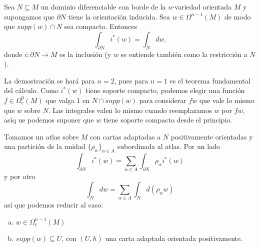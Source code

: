 \documentclass[CV.tex]{subfiles}
\begin{document}
\begin{teorema}[Stokes]
Sea $N\subseteq M$ un dominio diferenciable con borde de la $n$-variedad orientada $M$ y supongamos que $\partial N$ tiene la orientación inducida. Sea $w\in\Omega^{n-1}(M)$ de modo que $supp(w)\cap N$ sea compacto. Entonces
\[
\int_{\partial N} i^*(w)=\int_N dw.
\]
donde $i:\partial N\to M$ es la inclusión (y $w$ se entiende también como la restricción a $N$).
\end{teorema}
\begin{dem}
La demostración se hará para $n=2$, pues para $n=1$ es el teorema fundamental del cálculo. Como $i^*(w)$ tiene soporte compacto, podemos elegir una función $f\in\Omega_c^0(M)$ que valga 1 en $N\cap supp(w)$ para considerar $fw$ que vale lo mismo que $w$ sobre $N$. Las integrales valen lo mismo cuando reemplazamos $w$ por $fw$, asíq ue podemos suponer que $w$ tiene soporte compacto desde el principio. 

Tomamos un atlas sobre $M$ con cartas adaptadas a $N$ positivamente orientadas y una partición de la unidad $\{\rho_{\alpha}\}_{\alpha\in A}$ subordinada al atlas. Por un lado
\[
\int_{\partial N} i^*(w)=\sum_{\alpha\in A}\int_{\partial N}\rho_{\alpha} i^*(w)
\]
y por otro
\[
\int_N dw=\sum_{\alpha\in A}\int_N d(\rho_\alpha w)
\]
así que podemos reducir al caso:
\begin{enumerate}[a.]
 \item $w\in\Omega_c^{n-1}(M)$
 \item $supp(w)\subseteq U$, con $(U,h)$ una carta adaptada orientada positivamente. 
\end{enumerate}


\end{dem}
\end{document}
